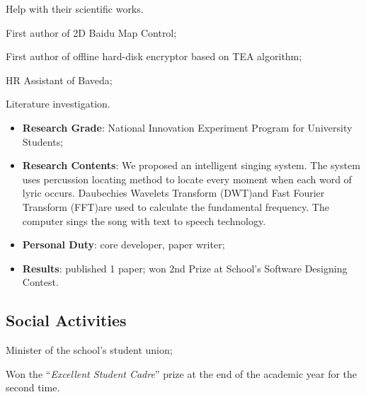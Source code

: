 \documentclass[11pt,a4paper,nolmodern]{moderncv}
\begin{document}
{Help with their scientific works.
\begin{tightitemize}%
 \item First author of 2D Baidu Map Control;
 \item First author of offline hard-disk encryptor based on TEA algorithm;
 \item HR Assistant of Baveda;
 \item Literature investigation.
 \end{tightitemize}}

%
  {
\begin{itemize}
 \item \textbf{Research Grade}: National Innovation Experiment Program for University Students;
 \item \textbf{Research Contents}: We proposed an intelligent singing system. The
   system uses percussion locating method to locate every moment when each word
   of lyric occurs. Daubechies Wavelets Transform (DWT)and Fast Fourier
   Transform (FFT)are used to calculate the fundamental frequency. The computer sings the song with text to speech technology.
 \item \textbf{Personal Duty}: core developer, paper writer;
 \item \textbf{Results}: published 1 paper; won 2nd Prize at School's Software Designing Contest.
\end{itemize}}

\subsection{Social Activities}


{
  \begin{tightitemize}%
    \item Minister of the school's student union;
    \item Won the ``\textsl{Excellent Student Cadre}'' prize at the end of the
      academic year for the second time.
 \end{tightitemize}}
\end{document}
